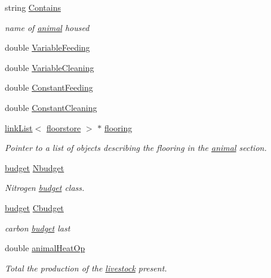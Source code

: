 \begin{DoxyCompactItemize}
string \hyperlink{classanimal_section_a683d78feb642fb9c47b7c6ca04fa06fb}{Contains}
\begin{DoxyCompactList}\small\item\em name of \hyperlink{classanimal}{animal} housed \item\end{DoxyCompactList}\item 
double \hyperlink{classanimal_section_a5c7d055ab1ea44cca81097b797c14f52}{VariableFeeding}
\item 
double \hyperlink{classanimal_section_adf379500a581d415c1dfee5d7a9dfdff}{VariableCleaning}
\item 
double \hyperlink{classanimal_section_a9c8c6bf7c47686872e99fc5e0978aa40}{ConstantFeeding}
\item 
double \hyperlink{classanimal_section_a0b615eac60c7a1da2c0ed2ad06e344aa}{ConstantCleaning}
\item 
\hyperlink{classlink_list}{linkList}$<$ \hyperlink{classfloorstore}{floorstore} $>$ $\ast$ \hyperlink{classanimal_section_aa0266aef51887e64de19e50263deb01f}{flooring}
\begin{DoxyCompactList}\small\item\em Pointer to a list of objects describing the flooring in the \hyperlink{classanimal}{animal} section. \item\end{DoxyCompactList}\item 
\hyperlink{classbudget}{budget} \hyperlink{classanimal_section_a9da1ddf7bdd6360f4595a020aa2ab5e7}{Nbudget}
\begin{DoxyCompactList}\small\item\em Nitrogen \hyperlink{classbudget}{budget} class. \item\end{DoxyCompactList}\item 
\hyperlink{classbudget}{budget} \hyperlink{classanimal_section_a6b36f885be582b5d2c9c32bbe8792cc8}{Cbudget}
\begin{DoxyCompactList}\small\item\em carbon \hyperlink{classbudget}{budget} last \item\end{DoxyCompactList}\item 
double \hyperlink{classanimal_section_aa615ab24431c87f4f728294d797cff06}{animalHeatOp}
\begin{DoxyCompactList}\small\item\em Total the production of the \hyperlink{classlivestock}{livestock} present. \item\end{DoxyCompactList}\end{DoxyCompactItemize}
